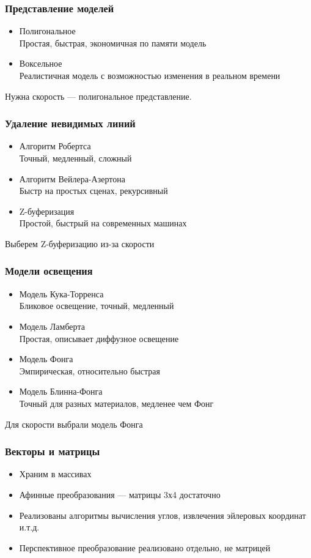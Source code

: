 \documentclass{beamer}
\begin{document}
\begin{frame}
\frametitle{Представление моделей}

\begin{itemize}
\item Полигональное \\
Простая, быстрая, экономичная по памяти модель
\item Воксельное \\
Реалистичная модель с возможностью изменения в реальном времени
\end{itemize}
Нужна скорость --- полигональное представление.
\end{frame}

\begin{frame}
\frametitle{Удаление невидимых линий}

\begin{itemize}
\item Алгоритм Робертса \\
Точный, медленный, сложный
\item Алгоритм Вейлера-Азертона \\
Быстр на простых сценах, рекурсивный
\item Z-буферизация \\
Простой, быстрый на современных машинах
\end{itemize}
Выберем Z-буферизацию из-за скорости
\end{frame}

\begin{frame}
\frametitle{Модели освещения}

\begin{itemize}
\item Модель Кука-Торренса \\
Бликовое освещение, точный, медленный
\item Модель Ламберта \\
Простая, описывает диффузное освещение
\item Модель Фонга \\
Эмпирическая, относительно быстрая
\item Модель Блинна-Фонга \\
Точный для разных материалов, медленее чем Фонг
\end{itemize}
Для скорости выбрали модель Фонга
\end{frame}

\begin{frame}
\frametitle{Векторы и матрицы}

\begin{itemize}
\item Храним в массивах
\item Афинные преобразования --- матрицы 3х4 достаточно
\item Реализованы алгоритмы вычисления углов, извлечения эйлеровых координат и.т.д.
\item Перспективное преобразование реализовано отдельно, не матрицей
\end{itemize}
\end{frame}
\end{document}
